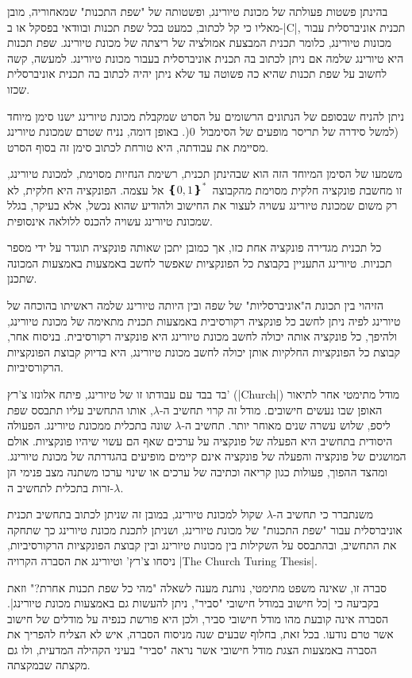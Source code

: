 בהינתן פשטות פעולתה של מכונת טיורינג, ופשטותה של "שפת התכנות" שמאחוריה, מובן
מאליו כי קל לכתוב, כמעט בכל שפת תכנות ובוודאי בפסקל או ב-\E|C|, תכנית
אוניברסלית עבור מכונות טיורינג, כלומר תכנית המבצעת אמולציה של ריצתה של מכונת
טיורינג. שפת תכנות היא טיורינג שלמה אם ניתן לכתוב בה תכנית אוניברסלית בעבור
מכונת טיורינג. למעשה, קשה לחשוב על שפת תכנות שהיא כה פשוטה עד שלא ניתן יהיה
לכתוב בה תכנית אוניברסלית שכזו.

ניתן להניח שבסופם של הנתונים הרשומים על הסרט שמקבלת מכונת טיורינג ישנו סימן
מיוחד (למשל סידרה של תריסר מופעים של הסימבול~$0$(. באופן דומה, נניח שטרם שמכונת
טיורינג מסיימת את עבודתה, היא טורחת לכתוב סימן זה בסוף הסרט.

משמעו של הסימן המיוחד הזה הוא שבהינתן תכנית, רשימת הנחיות מסוימת, למכונת
טיורינג, זו מחשבת פונקציה חלקית מסוימת מהקבוצה~$❴0,1❵^*$ אל עצמה. הפונקציה
היא חלקית, לא רק משום שמכונת טיורינג עשויה לעצור את החישוב ולהודיע שהוא נכשל,
אלא בעיקר, בגלל שמכונת טיורינג עשויה להכנס ללולאה אינסופית.

כל תכנית מגדירה פונקציה אחת כזו, אך כמובן יתכן שאותה פונקציה תוגדר על ידי מספר
תכניות. טיורינג התעניין בקבוצת כל הפונקציות שאפשר לחשב באמצעות באמצעות המכונה
שתכנן.

הזיהוי בין תכונת ה"אוניברסליות" של שפה ובין היותה טיורינג שלמה ראשיתו בהוכחה של
טיורינג לפיה ניתן לחשב כל פונקציה רקורסיבית באמצעות תכנית מתאימה של מכונת
טיורינג, ולהיפך, כל פונקציה אותה יכולה לחשב מכונת טיורינג היא פונקציה
רקורסיבית. בניסוח אחר, קבוצת כל הפונקציות החלקיות אותן יכולה לחשב מכונת
טיורינג, היא בדיוק קבוצת הפונקציות הרקורסיביות.

בד בבד עם עבודתו זו של טיורינג, פיתח אלונזו צ'רץ' (\E|Church|) מודל
מתימטי אחר לתיאור האופן שבו נעשים חישובים. מודל זה קרוי תחשיב ה-$λ$, אותו התחשיב
עליו תתבסס שפת ליספ, שלוש עשרה שנים מאוחר יותר. תחשיב ה-$λ$ שונה בתכלית ממכונת
טיורינג. הפעולה היסודית בתחשיב היא הפעלה של פונקציה על ערכים שאף הם עשוי שיהיו
פונקציות. אולם המושגים של פונקציה והפעלה של פונקציה אינם קיימים מופיעים בהגדרתה
של מכונת טיורינג. ומהצד ההפוך, פעולות כגון קריאה וכתיבה של ערכים או שינוי ערכו
משתנה מצב פנימי הן זרות בתכלית לתחשיב ה-$λ$.

משנתברר כי תחשיב ה-$λ$ שקול למכונת טיורינג, במובן זה שניתן לכתוב בתחשיב תכנית
אוניברסלית עבור "שפת התכנות" של מכונת טיורינג, ושניתן לתכנת מכונת טיורינג כך
שתחקה את התחשיב, ובהתבסס על השקילות בין מכונות טיורינג ובין קבוצת הפונקציות
הרקורסיביות, ניסחו צ'רץ' וטיורינג את הסברה הקרויה \E|The Church Turing Thesis|.

סברה זו, שאינה משפט מתימטי, נותנת מענה לשאלה "מהי כל שפת תכנות אחרת?" וזאת
בקביעה כי \ע|כל חישוב במודל חישובי "סביר", ניתן להעשות גם באמצעות מכונת
טיורינג|. הסברה אינה קובעת מהו מודל חישובי סביר, ולכן היא פורשת כנפיה על
מודלים של חישוב אשר טרם נודעו. בכל זאת, בחלוף שבעים שנה מניסוח הסברה,
איש לא הצליח להפריך את הסברה באמצעות הצגת מודל חישובי אשר נראה "סביר"
בעיני הקהילה המדעית, ולו גם מקצתה שבמקצתה.

